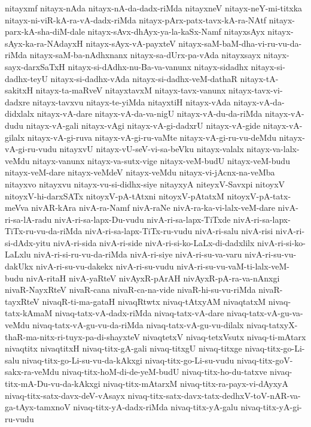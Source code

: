 {nitayxmf
nitayx-nAda
nitayx-nA-da-dadx-riMda
nitayxneV
nitayx-neY-mi-titxka
nitayx-ni-viR-kA-ra-vA-dadx-riMda
nitayx-pArx-patx-tavx-kA-ra-NAtf
nitayx-parx-kA-sha-diM-dale
nitayx-sAvx-dhAyx-ya-la-kaSx-Namf
nitayxsAyx
nitayx-sAyx-ka-ra-NAdayxH
nitayx-sAyx-vA-payxteV
nitayx-saM-baM-dha-vi-ru-vu-da-riMda
nitayx-saM-ba-nAdhxnanx
nitayx-sa-dUrx-pa-vAda
nitayxsayx
nitayx-sayx-darxSaTxH
nitayx-si-dAdhx-nu-Ba-va-vanunx
nitayx-sidadhx
nitayx-si-dadhx-teyU
nitayx-si-dadhx-vAda
nitayx-si-dadhx-veM-dathaR
nitayx-tA-sakitxH
nitayx-ta-maRveV
nitayxtavxM
nitayx-tavx-vanunx
nitayx-tavx-vi-dadxre
nitayx-tavxvu
nitayx-te-yiMda
nitayxtiH
nitayx-vAda
nitayx-vA-da-didxlalx
nitayx-vA-dare
nitayx-vA-da-va-nigU
nitayx-vA-du-da-riMda
nitayx-vA-dudu
nitayx-vA-gali
nitayx-vAgi
nitayx-vA-gi-dadxrU
nitayx-vA-gide
nitayx-vA-gilalx
nitayx-vA-gi-ruva
nitayx-vA-gi-ru-vaMte
nitayx-vA-gi-ru-vu-deMdu
nitayx-vA-gi-ru-vudu
nitayxvU
nitayx-vU-seV-vi-sa-beVku
nitayx-valalx
nitayx-va-lalx-veMdu
nitayx-vanunx
nitayx-va-sutx-vige
nitayx-veM-budU
nitayx-veM-budu
nitayx-veM-dare
nitayx-veMdeV
nitayx-veMdu
nitayx-vi-jAcnx-na-veMba
nitayxvo
nitayxvu
nitayx-vu-si-didhx-siye
nitayxyA
niteyxV-Savxpi
nitoyxV
nitoyxV-hi-darxSATx
nitoyxV-pA-tAtxni
nitoyxV-pAtatxM
nitoyxV-pA-tatx-meVva
nivAR-kAra
nivA-ra-Namf
nivA-raNe
nivA-ra-ka-vi-lalx-veM-dare
nivA-ri-sa-lA-radu
nivA-ri-sa-lapx-Du-vudu
nivA-ri-sa-lapx-TiTxde
nivA-ri-sa-lapx-TiTx-ru-vu-da-riMda
nivA-ri-sa-lapx-TiTx-ru-vudu
nivA-ri-salu
nivA-risi
nivA-ri-si-dAdx-yitu
nivA-ri-sida
nivA-ri-side
nivA-ri-si-ko-LaLx-di-dadxlilx
nivA-ri-si-ko-LaLxlu
nivA-ri-si-ru-vu-da-riMda
nivA-ri-siye
nivA-ri-su-va-varu
nivA-ri-su-vu-dakUkx
nivA-ri-su-vu-dakekx
nivA-ri-su-vudu
nivA-ri-su-vu-vaM-ti-lalx-veM-budu
nivA-ritaH
nivA-yaRteV
nivAyxR-pArAH
nivAyxR-pA-ra-va-nAnxgi
nivaR-NayxRteV
nivaR-cana
nivaR-ca-na-vide
nivaR-hi-su-vu-riMda
nivaR-tayxRteV
nivaqR-ti-ma-gataH
nivaqRtwtx
nivaq-tAtxyAM
nivaqtatxM
nivaq-tatx-kAmaM
nivaq-tatx-vA-dadx-riMda
nivaq-tatx-vA-dare
nivaq-tatx-vA-gu-va-veMdu
nivaq-tatx-vA-gu-vu-da-riMda
nivaq-tatx-vA-gu-vu-dilalx
nivaq-tatxyX-thaR-ma-nitx-ri-tuyx-pa-di-shayxteV
nivaqtetxV
nivaq-tetxVsutx
nivaq-ti-mAtarx
nivaqtitx
nivaqtitxH
nivaq-titx-gA-gali
nivaq-titxgU
nivaq-titxge
nivaq-titx-go-Li-salu
nivaq-titx-go-Li-su-vu-da-kAkxgi
nivaq-titx-go-Li-su-vudu
nivaq-titx-goV-sakx-ra-veMdu
nivaq-titx-hoM-di-de-yeM-budU
nivaq-titx-ho-du-tatxve
nivaq-titx-mA-Du-vu-da-kAkxgi
nivaq-titx-mAtarxM
nivaq-titx-ra-payx-vi-dAyxyA
nivaq-titx-satx-davx-deV-vAsayx
nivaq-titx-satx-davx-tatx-dedhxV-toV-nAR-va-ga-tAyx-tamxnoV
nivaq-titx-yA-dadx-riMda
nivaq-titx-yA-galu
nivaq-titx-yA-gi-ru-vudu
}
